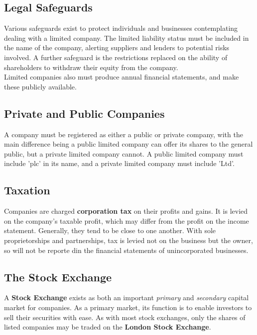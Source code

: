 \documentclass{report}
\begin{document}
\subsection{Legal Safeguards}
Various safeguards exist to protect individuals and businesses contemplating dealing with a limited company. The limited liability status must be included in the name of the company, alerting suppliers and lenders to potential risks involved. A further safeguard is the restrictions replaced on the ability of shareholders to withdraw their equity from the company.\\

Limited companies also must produce annual financial statements, and make these publicly available.

\subsection{Private and Public Companies}
A company must be registered as either a public or private company, with the main difference being a public limited company can offer its shares to the general public, but a private limited company cannot. A public limited company must include 'plc' in its name, and a private limited company must include 'Ltd'.

\subsection{Taxation}
Companies are charged \textbf{corporation tax} on their profits and gains. It is levied on the company's taxable profit, which may differ from the profit on the income statement. Generally, they tend to be close to one another. With sole proprietorships and partnerships, tax is levied not on the business but the owner, so will not be reporte din the financial statements of unincorporated businesses.

\subsection{The Stock Exchange}
A \textbf{Stock Exchange} exists as both an important \textit{primary} and \textit{secondary} capital market for companies. As a primary market, its function is to enable investors to sell their securities with ease. As with most stock exchanges, only the shares of listed companies may be traded on the \textbf{London Stock Exchange}.

\end{document}
